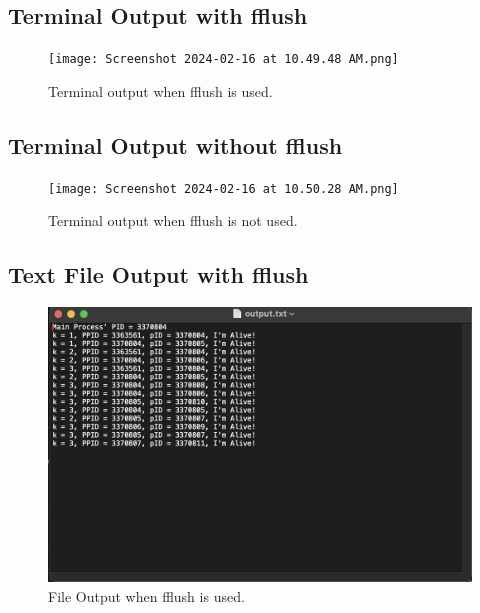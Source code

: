 \documentclass[12pt]{article}
\begin{document}
  \subsection{Terminal Output with fflush}
    \begin{figure}[h]
    \centering
    \texttt{[image: Screenshot 2024-02-16 at 10.49.48 AM.png]}
    \caption{Terminal output when fflush is used.}
    \end{figure}

\subsection{Terminal Output without fflush}
\begin{figure}[h]
\centering
\texttt{[image: Screenshot 2024-02-16 at 10.50.28 AM.png]}
\caption{Terminal output when fflush is not used.}
\end{figure}

\subsection{Text File Output with fflush}
\begin{figure}[h]
\centering
\includegraphics[width=\textwidth]{output_with_fflush.png}
\caption{File Output when fflush is used.}
\end{figure}

\newpage
\end{document}

